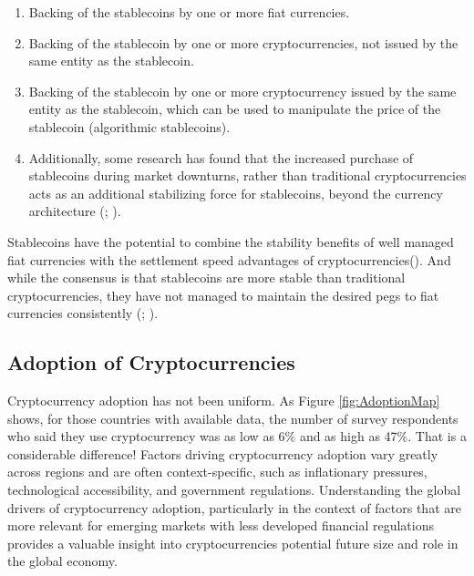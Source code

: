 \documentclass[
]{article}
\begin{document}
\begin{enumerate}
\def\labelenumi{\arabic{enumi}.}
\item
  Backing of the stablecoins by one or more fiat currencies.
\item
  Backing of the stablecoin by one or more cryptocurrencies, not issued by the same entity as the stablecoin.
\item
  Backing of the stablecoin by one or more cryptocurrency issued by the same entity as the stablecoin, which can be used to manipulate the price of the stablecoin (algorithmic stablecoins).
\item
  Additionally, some research has found that the increased purchase of stablecoins during market downturns, rather than traditional cryptocurrencies acts as an additional stabilizing force for stablecoins, beyond the currency architecture (; ).
\end{enumerate}

Stablecoins have the potential to combine the stability benefits of well managed fiat currencies with the settlement speed advantages of cryptocurrencies(). And while the consensus is that stablecoins are more stable than traditional cryptocurrencies, they have not managed to maintain the desired pegs to fiat currencies consistently (; ).

\subsection{Adoption of Cryptocurrencies}\label{adoption-of-cryptocurrencies}

Cryptocurrency adoption has not been uniform. As Figure \ref{fig:AdoptionMap} shows, for those countries with available data, the number of survey respondents who said they use cryptocurrency was as low as 6\% and as high as 47\%. That is a considerable difference! Factors driving cryptocurrency adoption vary greatly across regions and are often context-specific, such as inflationary pressures, technological accessibility, and government regulations. Understanding the global drivers of cryptocurrency adoption, particularly in the context of factors that are more relevant for emerging markets with less developed financial regulations provides a valuable insight into cryptocurrencies potential future size and role in the global economy.
\end{document}
